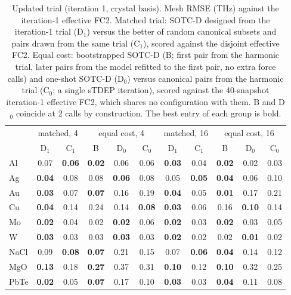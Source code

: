\begin{table}[t]
\caption{Updated trial (iteration 1, crystal basis). Mesh RMSE (THz) against the iteration-1 effective FC2. Matched trial: SOTC-D designed from the iteration-1 trial (D$_1$) versus the better of random canonical subsets and pairs drawn from the same trial (C$_1$), scored against the disjoint effective FC2. Equal cost: bootstrapped SOTC-D (B; first pair from the harmonic trial, later pairs from the model refitted to the first pair, no extra force calls) and one-shot SOTC-D (D$_0$) versus canonical pairs from the harmonic trial (C$_0$; a single sTDEP iteration), scored against the 40-snapshot iteration-1 effective FC2, which shares no configuration with them. B and D$_0$ coincide at 2 calls by construction. The best entry of each group is bold.}
\label{tab:selfconsistent_crystal_4_16}
\begin{ruledtabular}
\begin{tabular}{lcccccccccc}
 & \multicolumn{2}{c}{matched, 4} & \multicolumn{3}{c}{equal cost, 4} & \multicolumn{2}{c}{matched, 16} & \multicolumn{3}{c}{equal cost, 16}\\
 & D$_1$ & C$_1$ & B & D$_0$ & C$_0$ & D$_1$ & C$_1$ & B & D$_0$ & C$_0$\\
\hline
Al & 0.07 & \textbf{0.06} & \textbf{0.02} & 0.06 & 0.06 & \textbf{0.03} & 0.04 & \textbf{0.02} & 0.02 & 0.03\\
Ag & \textbf{0.04} & 0.08 & 0.08 & \textbf{0.06} & 0.08 & 0.05 & \textbf{0.05} & \textbf{0.04} & 0.06 & 0.10\\
Au & \textbf{0.03} & 0.07 & \textbf{0.07} & 0.16 & 0.19 & \textbf{0.04} & 0.05 & \textbf{0.01} & 0.17 & 0.21\\
Cu & \textbf{0.04} & 0.14 & 0.24 & 0.14 & \textbf{0.08} & \textbf{0.03} & 0.06 & 0.16 & \textbf{0.10} & 0.14\\
Mo & \textbf{0.02} & 0.04 & 0.02 & \textbf{0.02} & 0.06 & \textbf{0.02} & 0.03 & \textbf{0.02} & 0.03 & 0.05\\
W & \textbf{0.03} & 0.03 & 0.03 & \textbf{0.03} & 0.03 & \textbf{0.02} & 0.02 & 0.02 & \textbf{0.01} & 0.02\\
NaCl & 0.09 & \textbf{0.08} & \textbf{0.07} & 0.21 & 0.15 & 0.07 & \textbf{0.06} & \textbf{0.04} & 0.14 & 0.12\\
MgO & \textbf{0.13} & 0.18 & \textbf{0.27} & 0.37 & 0.31 & \textbf{0.10} & 0.12 & \textbf{0.10} & 0.32 & 0.25\\
PbTe & \textbf{0.02} & 0.05 & \textbf{0.07} & 0.17 & 0.10 & \textbf{0.03} & 0.03 & \textbf{0.04} & 0.11 & 0.08\\

\end{tabular}
\end{ruledtabular}
\end{table}
